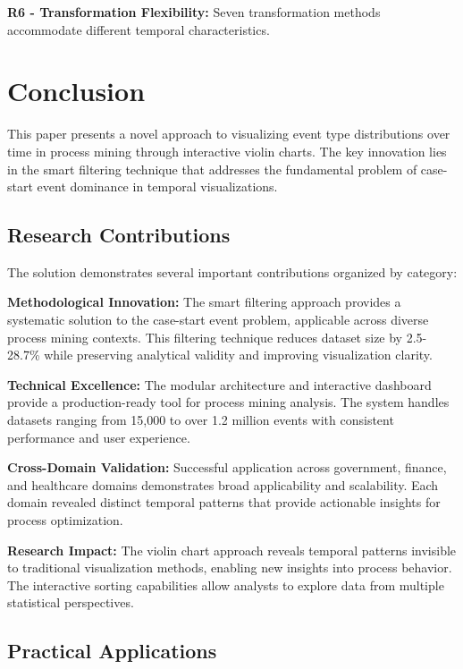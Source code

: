 \documentclass[11pt,a4paper]{article}
\begin{document}
\textbf{R6 - Transformation Flexibility:} Seven transformation methods accommodate different temporal characteristics.

\section{Conclusion}
\label{sec:conclusion}

This paper presents a novel approach to visualizing event type distributions over time in process mining through interactive violin charts. The key innovation lies in the smart filtering technique that addresses the fundamental problem of case-start event dominance in temporal visualizations.

\subsection{Research Contributions}

The solution demonstrates several important contributions organized by category:

\textbf{Methodological Innovation:} The smart filtering approach provides a systematic solution to the case-start event problem, applicable across diverse process mining contexts. This filtering technique reduces dataset size by 2.5-28.7\% while preserving analytical validity and improving visualization clarity.

\textbf{Technical Excellence:} The modular architecture and interactive dashboard provide a production-ready tool for process mining analysis. The system handles datasets ranging from 15,000 to over 1.2 million events with consistent performance and user experience.

\textbf{Cross-Domain Validation:} Successful application across government, finance, and healthcare domains demonstrates broad applicability and scalability. Each domain revealed distinct temporal patterns that provide actionable insights for process optimization.

\textbf{Research Impact:} The violin chart approach reveals temporal patterns invisible to traditional visualization methods, enabling new insights into process behavior. The interactive sorting capabilities allow analysts to explore data from multiple statistical perspectives.

\subsection{Practical Applications}
\end{document}
